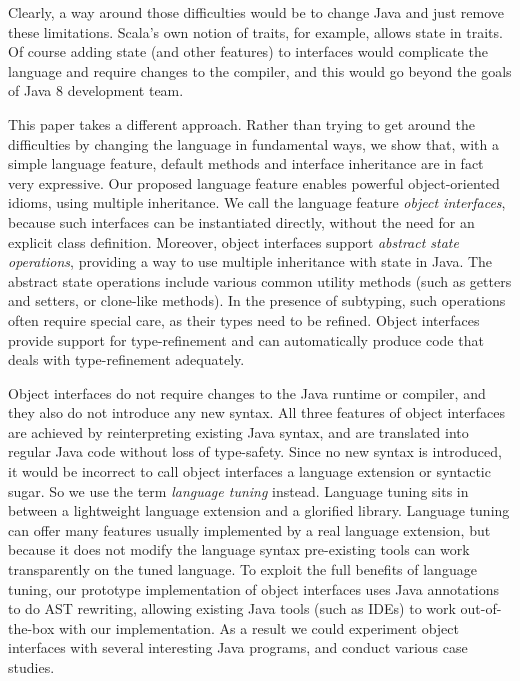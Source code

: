 \noindent Clearly, a way around those difficulties would be to
change Java and just remove these limitations. Scala's own
notion of traits, for example, allows state in traits. Of course adding
state (and other features) to interfaces would complicate the language
and require changes to the compiler, and this would go beyond the
goals of Java 8 development team.

This paper takes a different approach. Rather than trying to get
around the difficulties by changing the language in fundamental ways,
we show that, with a simple language feature, default methods and
interface inheritance are in fact very expressive. Our proposed
language feature enables powerful object-oriented idioms, using
multiple inheritance. We call the language feature \emph{object
  interfaces}, because such interfaces can be instantiated directly,
without the need for an explicit class definition. Moreover, object
interfaces support \emph{abstract state operations}, providing a way
to use multiple inheritance with state in Java. The abstract state
operations include various common utility methods (such as getters and
setters, or clone-like methods). In the presence of subtyping, such
operations often require special care, as their types need to be
refined. Object interfaces provide support for type-refinement and can
automatically produce code that deals with type-refinement
adequately. %

Object interfaces do not require changes to the Java runtime or compiler, 
and they also do not introduce any new syntax. All three features of object interfaces are
achieved by reinterpreting existing Java syntax, and are translated
into regular Java code without loss of type-safety. Since no new
syntax is introduced, it would be incorrect to call object interfaces
a language extension or syntactic sugar. So we use the term
\emph{language tuning} instead. Language tuning sits in between a
lightweight language extension and a glorified library. Language
tuning can offer many features usually implemented by a real language
extension, but because it does not modify the language syntax
pre-existing tools can work transparently on the tuned language.  To
exploit the full benefits of language tuning, our prototype
implementation of object interfaces uses Java annotations to do AST
rewriting, allowing existing Java tools (such as IDEs) to work
out-of-the-box with our implementation. As a result we could
experiment object interfaces with several interesting Java programs,
and conduct various case studies.


